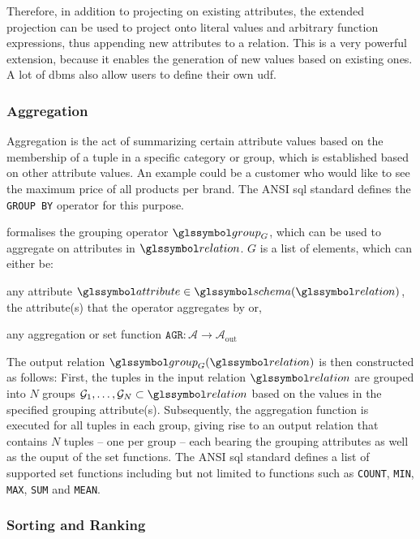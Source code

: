 Therefore, in addition to projecting on existing attributes, the extended projection can be used to project onto literal values and arbitrary function expressions, thus appending new attributes to a relation. This is a very powerful extension, because it enables the generation of new values based on existing ones. A lot of \acrshort{dbms} also allow users to define their own \acrfull{udf}.

\subsubsection{Aggregation}

Aggregation is the act of summarizing certain attribute values based on the membership of a tuple in a specific category or group, which is established based on other attribute values. An example could be a customer who would like to see the maximum price of all products per brand. The ANSI \acrshort{sql} standard \cite{XOpen:1996SQL} defines the \texttt{GROUP BY} operator for this purpose.

\cite{Garcia:2009Database} formalises the grouping operator $\group_{G}$, which can be used to aggregate on attributes in $\relation$. $G$ is a list of elements, which can either be:
\begin{enumerate*}[label=(\roman*)]
    \item any attribute $\attribute \in \schema(\relation)$, the attribute(s) that the operator aggregates by or,
    \item any aggregation or set function $\texttt{AGR} \colon \mathcal{A} \rightarrow \mathcal{A}_{\text{out}}$
\end{enumerate*}

The output relation $\group_G (\relation)$ is then constructed as follows: First, the tuples in the input relation  $\relation$ are grouped into $N$ groups $\mathcal{G}_1, \ldots,\mathcal{G}_N \subset \relation$ based on the values in the specified grouping attribute(s). Subsequently, the aggregation function is executed for all tuples in each group, giving rise to an output relation that contains $N$ tuples --  one per group -- each bearing the grouping attributes as well as the ouput of the set functions. The ANSI \acrshort{sql} standard \cite{XOpen:1996SQL} defines a list of supported set functions including but not limited to functions such as \texttt{COUNT}, \texttt{MIN}, \texttt{MAX}, \texttt{SUM} and \texttt{MEAN}.

\subsubsection{Sorting and Ranking}

